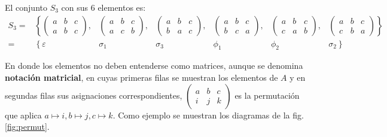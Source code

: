 El conjunto $S_3$ con sus 6 elementos es:
\[ \begin{array}{rcccccc}
	S_3 = & \left\{ \begin{pmatrix}
		a & b & c\\
		a & b & c
	\end{pmatrix}, \right. & \begin{pmatrix}
		a & b & c\\
		a & c & b
	\end{pmatrix}, & \begin{pmatrix}
		a & b & c\\
		b & a & c
	\end{pmatrix}, & \begin{pmatrix}
		a & b & c\\
		b & c & a
	\end{pmatrix}, & \begin{pmatrix}
		a & b & c\\
		c & a & b
	\end{pmatrix}, & \left. \begin{pmatrix}
		a & b & c\\
		c & b & a
	\end{pmatrix} \right\} \\[5mm]
	= & \left\{  \varepsilon \right. & \sigma_1 & \sigma_3 & \phi_1 & \phi_2 & \left. \sigma_2 \right\}
\end{array} \]

En donde los elementos no deben entenderse como matrices, aunque se denomina \textbf{notación matricial}, en cuyas primeras filas se muestran los elementos de $A$ y en segundas filas sus asignaciones correspondientes, $\begin{pmatrix}
	a & b & c \\ i & j & k
\end{pmatrix}$ es la permutación que aplica $a \mapsto i, b \mapsto j, c \mapsto k $. Como ejemplo se muestran los diagramas de la fig. \ref{fig:permut}.

